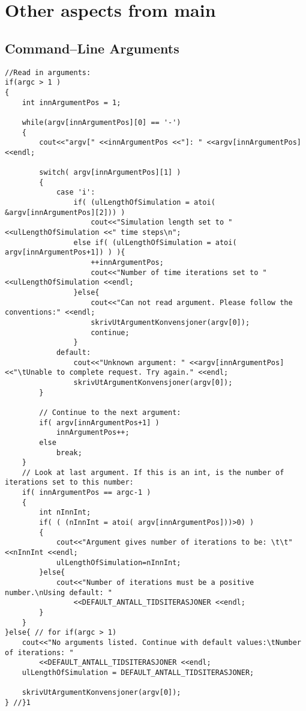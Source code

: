 \chapter{Other aspects from main} %

\section{Command--Line Arguments}
\label{appendixCommandLineArguments}
\begin{lstlisting}
//Read in arguments:
if(argc > 1 ) 
{
	int innArgumentPos = 1;

	while(argv[innArgumentPos][0] == '-')
	{
		cout<<"argv[" <<innArgumentPos <<"]: " <<argv[innArgumentPos] <<endl;

		switch( argv[innArgumentPos][1] )
		{
			case 'i':
				if( (ulLengthOfSimulation = atoi( &argv[innArgumentPos][2])) )
					cout<<"Simulation length set to " <<ulLengthOfSimulation <<" time steps\n";
				else if( (ulLengthOfSimulation = atoi( argv[innArgumentPos+1]) ) ){
					++innArgumentPos;
					cout<<"Number of time iterations set to " <<ulLengthOfSimulation <<endl;
				}else{
					cout<<"Can not read argument. Please follow the conventions:" <<endl;
					skrivUtArgumentKonvensjoner(argv[0]);
					continue;
				}
			default:
				cout<<"Unknown argument: " <<argv[innArgumentPos] <<"\tUnable to complete request. Try again." <<endl;
				skrivUtArgumentKonvensjoner(argv[0]);
		}

		// Continue to the next argument:
		if( argv[innArgumentPos+1] ) 
			innArgumentPos++;
		else 
			break;
	}
	// Look at last argument. If this is an int, is the number of iterations set to this number:
	if( innArgumentPos == argc-1 )
	{
		int nInnInt;
		if( ( (nInnInt = atoi( argv[innArgumentPos]))>0) )
		{
			cout<<"Argument gives number of iterations to be: \t\t" <<nInnInt <<endl;
			ulLengthOfSimulation=nInnInt;
		}else{
			cout<<"Number of iterations must be a positive number.\nUsing default: "
				<<DEFAULT_ANTALL_TIDSITERASJONER <<endl;
		}
	}
}else{ // for if(argc > 1)
	cout<<"No arguments listed. Continue with default values:\tNumber of iterations: "
		<<DEFAULT_ANTALL_TIDSITERASJONER <<endl;
	ulLengthOfSimulation = DEFAULT_ANTALL_TIDSITERASJONER;

	skrivUtArgumentKonvensjoner(argv[0]);
} //}1
\end{lstlisting}
